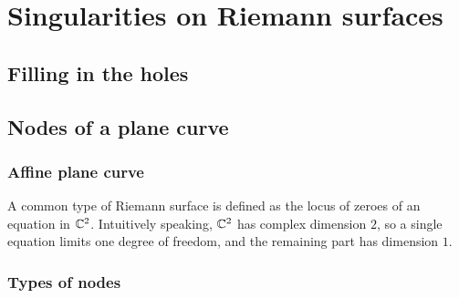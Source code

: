 \chapter{Singularities on Riemann surfaces}
\label{ch:singularity_riemann}

\section{Filling in the holes}

\section{Nodes of a plane curve}

\subsection{Affine plane curve}
A common type of Riemann surface is defined as the locus of zeroes of an equation in $\mathbb C^2$.
Intuitively speaking, $\mathbb C^2$ has complex dimension $2$, so a single equation limits one degree of
freedom, and the remaining part has dimension $1$.

\subsection{Types of nodes}



